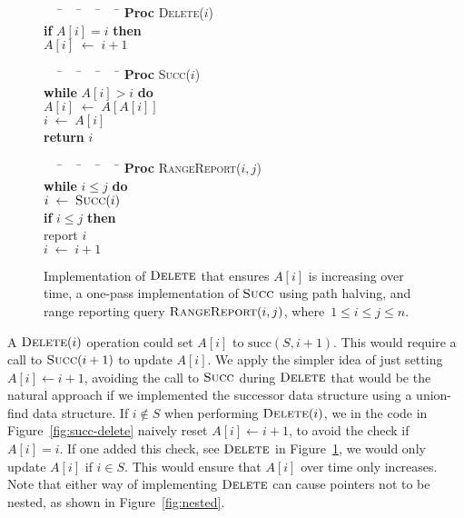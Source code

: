 \documentclass[a4paper]{lipics-v2021}
\newcommand{\successor}{\mathrm{succ}}
\newenvironment{figurebox}
  {\begin{lrbox}{\myframedbox}%
   \begin{minipage}{\dimexpr\linewidth-2\fboxsep-2\fboxrule}%
   \centering}
  {\end{minipage}%
   \end{lrbox}\fbox{\usebox{\myframedbox}}}
\newcommand{\FuncName}[1]{\textup{\textsc{#1}}}
\newcommand{\Delete}{\FuncName{Delete}}
\newcommand{\Succ}{\FuncName{Succ}}
\newcommand{\RangeReport}{\FuncName{RangeReport}}
\newcommand{\Keyword}[1]{\textbf{#1}}
\newcommand{\WHILE}[1]{\Keyword{while} $#1$ \Keyword{do}}
\newcommand{\ASSIGN}[2]{\mbox{$#1 \;\leftarrow\; #2$}}
\newcommand{\RETURN}[1]{\Keyword{return} $#1$}
\newcommand{\IF}[1]{\Keyword{if} $#1$ \Keyword{then}}
\newcommand{\PROC}[2]{\Keyword{Proc} \FuncName{#1}($#2$)}
\newenvironment{code}
  {\begin{minipage}[t]{0cm}\begin{tabbing}~~~\=~~~\=~~~\=~~~\=\kill}
  {\end{tabbing}\end{minipage}}
\begin{document}
\begin{figure}[t]
  \begin{figurebox}
    \centering
    \begin{code}
      \PROC{Delete}{i} \\
      \> \IF{A[i] = i} \\
      \>\> \ASSIGN{A[i]}{i + 1}
    \end{code}
    \hspace{2.5em}
    \begin{code}
      \PROC{Succ}{i} \\
      \> \WHILE{A[i] > i} \\
      \>\> \ASSIGN{A[i]}{A[A[i]]} \\
      \>\> \ASSIGN{i}{A[i]} \\
      \> \RETURN{i}
    \end{code}
    \hspace{2.5em}
    \begin{code}
      \PROC{RangeReport}{i, j} \\
      \> \WHILE{i \leq j} \\
      \>\> \ASSIGN{i}{\Succ(i)} \\
      \>\> \IF{i \leq j} \\
      \>\>\> report $i$ \\
      \>\>\> \ASSIGN{i}{i+1}
    \end{code}
  \end{figurebox}

  \caption{Implementation of $\Delete$ that ensures $A[i]$ is increasing over time, a one-pass implementation of $\Succ$ using path halving, and range reporting query $\RangeReport(i,j)$, where~$1 \leq i \leq j \leq n$.}
  \label{fig:succ-delete-variations}
\end{figure}

A $\Delete(i)$ operation could set $A[i]$ to $\successor(S,i+1)$. This would require a call to $\Succ(i+1)$ to update $A[i]$. We apply the simpler idea of just setting $A[i] \leftarrow i+1$, avoiding the call to $\Succ$ during $\Delete$ that would be the natural approach if we implemented the successor data structure using a union-find data structure. If $i\notin S$ when performing $\Delete(i)$, we in the code in Figure~\ref{fig:succ-delete} naively reset $A[i] \leftarrow i+1$, to avoid the check if~$A[i]=i$. If one added this check, see $\Delete$ in Figure~\ref{fig:succ-delete-variations}, we would only update $A[i]$ if $i \in S$. This would ensure that $A[i]$ over time only increases. Note that either way of implementing $\Delete$ can cause pointers not to be nested, as shown in Figure~\ref{fig:nested}.
\end{document}
